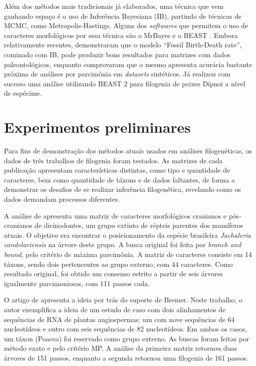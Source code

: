 \documentclass[12pt]{article}
\begin{document}
Além dos métodos mais tradicionais já elaborados, uma técnica que vem ganhando espaço é o uso de Inferência Bayesiana (IB)\cite{tschopp2018challenges}, partindo de técnicas de MCMC, como Metropolis-Hastings. Alguns dos \emph{softwares}  que permitem o uso de caracteres morfológicos por essa técnica são o MrBayes \cite{mr-bayes} e o BEAST \cite{beast}. Embora relativamente recentes, \cite{mongiardino2021fossils} demonstraram que o modelo ``Fossil Birth-Death rate'', cominado com IB, pode produzir bons resultados para matrizes com dados paleontológicos, enquanto \cite{implied-ranting} comprovaram que o mesmo apresenta acurácia bastante próxima de análises por parcimônia em \emph{datasets} sintéticos. Já \cite{cau2017specimen} realizou com sucesso uma análise utilizando BEAST 2 \cite{beast-2} para filogenia de peixes Dipnoi a nível de espécime.

\section{Experimentos preliminares}

Para fins de demonstração dos métodos atuais usados em análises filogenéticas, os dados de três trabalhos de filogenia foram testados. As matrizes de cada publicação apresentam características distintas, como tipo e quantidade de caracteres, bem como quantidade de táxons e de dados faltantes, de forma a demonstrar os desafios de se realizar inferência filogenética, revelando como os dados demandam processos diferentes.

A análise de \cite{dicynodonts-cris} apresenta uma matriz de caracteres morfológicos cranianos e pós-cranianos de dicinodontes, um grupo extinto de répteis parentes dos mamíferos atuais. O objetivo era encontrar o posicionamento da espécie brasileira \emph{Jachaleria candelariensis} na árvore deste grupo. A busca original foi feita por \emph{branch and bound}, pelo critério de máxima parcimônia. A matriz de caracteres consiste em 14 táxons, sendo dois pertencentes ao grupo externo, com 44 caracteres. Como resultado original, foi obtido um consenso estrito a partir de seis árvores igualmente parcimoniosas, com 111 passos cada. 

O artigo de \cite{bremer-support} apresenta a ideia por trás do suporte de Bremer. Neste trabalho, o autor exemplifica a ideia de um estudo de caso com dois alinhamentos de sequências de RNA de plantas angiospermas: um com nove sequências de 64 nucleotídeos e outro com seis sequências de 82 nucleotídeos. Em ambos os casos, um táxon (Poacea) foi reservado como grupo externo. As buscas foram feitas por método exato e pelo critério MP. A análise da primeira matriz retornou duas árvores de 151 passos, enquanto a segunda retornou uma filogenia de 161 passos.
\end{document}

